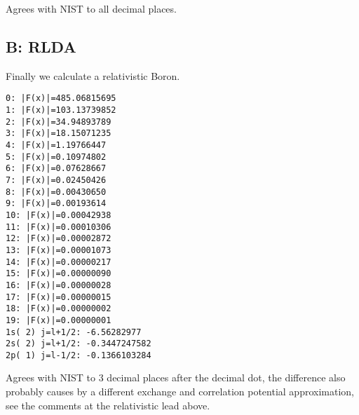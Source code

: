 Agrees with NIST\cite{nist} to all decimal places.

\subsection{B: RLDA}

Finally we calculate a relativistic Boron.

\begin{lstlisting}
0: |F(x)|=485.06815695
1: |F(x)|=103.13739852
2: |F(x)|=34.94893789
3: |F(x)|=18.15071235
4: |F(x)|=1.19766447
5: |F(x)|=0.10974802
6: |F(x)|=0.07628667
7: |F(x)|=0.02450426
8: |F(x)|=0.00430650
9: |F(x)|=0.00193614
10: |F(x)|=0.00042938
11: |F(x)|=0.00010306
12: |F(x)|=0.00002872
13: |F(x)|=0.00001073
14: |F(x)|=0.00000217
15: |F(x)|=0.00000090
16: |F(x)|=0.00000028
17: |F(x)|=0.00000015
18: |F(x)|=0.00000002
19: |F(x)|=0.00000001
1s( 2) j=l+1/2: -6.56282977
2s( 2) j=l+1/2: -0.3447247582
2p( 1) j=l-1/2: -0.1366103284
\end{lstlisting}

Agrees with NIST\cite{nist} to 3 decimal places after the decimal dot, the
difference also probably causes by a different exchange and correlation
potential approximation, see the comments at the relativistic lead above.
